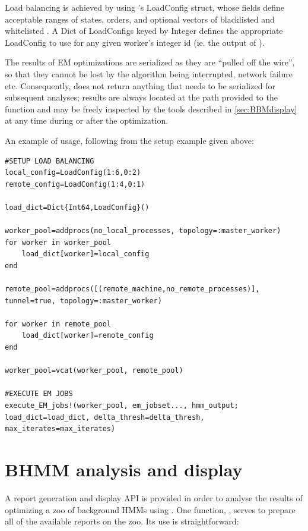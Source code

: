 \documentclass{ut-thesis}
\begin{document}
\begin{NoHyper}
Load balancing is achieved by using 's LoadConfig struct, whose fields define acceptable ranges of states, orders, and optional vectors of blacklisted and whitelisted . A Dict of LoadConfigs keyed by Integer defines the appropriate LoadConfig to use for any given worker's integer id (ie. the output of ).

The results of EM optimizations are serialized as they are ``pulled off the wire'', so that they cannot be lost by the algorithm being interrupted, network failure etc. Consequently,  does not return anything that needs to be serialized for subsequent analyses; results are always located at the path provided to the function and may be freely inspected by the tools described in \autoref{sec:BBMdisplay} at any time during or after the optimization.

An example of  usage, following from the setup example given above:

\begin{verbatim}
#SETUP LOAD BALANCING
local_config=LoadConfig(1:6,0:2)
remote_config=LoadConfig(1:4,0:1)

load_dict=Dict{Int64,LoadConfig}()

worker_pool=addprocs(no_local_processes, topology=:master_worker)
for worker in worker_pool
    load_dict[worker]=local_config
end

remote_pool=addprocs([(remote_machine,no_remote_processes)], tunnel=true, topology=:master_worker)

for worker in remote_pool
    load_dict[worker]=remote_config
end

worker_pool=vcat(worker_pool, remote_pool)

#EXECUTE EM JOBS
execute_EM_jobs!(worker_pool, em_jobset..., hmm_output; load_dict=load_dict, delta_thresh=delta_thresh, max_iterates=max_iterates)
\end{verbatim}

\section{BHMM analysis and display}
\label{sec:BBMdisplay}
A report generation and display API is provided in order to analyse the results of optimizing a zoo of background HMMs using . One function, , serves to prepare all of the available reports on the zoo. Its use is straightforward:


\end{NoHyper}
\end{document}

